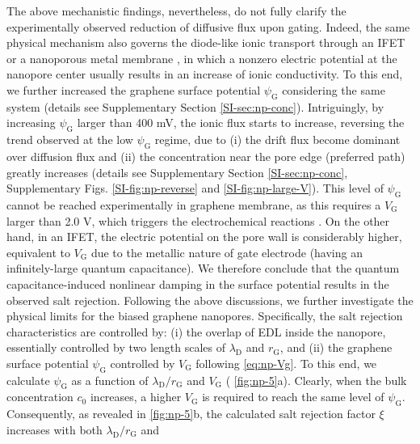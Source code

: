 The above mechanistic findings, nevertheless, do not fully clarify the
experimentally observed reduction of diffusive flux upon
gating. Indeed, the same physical mechanism also governs the {
  diode-like ionic transport through an IFET
  \cite{Nam_2009_IFET_sub10nm,Lee_2015_sub10nm,Feng_2016_porous_MoS2} or a nanoporous metal membrane
  \cite{Mccurry_2017_electrolyte_porus_gold}}, in which a nonzero electric
potential at the nanopore center usually results in an increase of
ionic conductivity. To this end, we further increased the graphene
surface potential $\psi_{\mathrm{G}}$ considering the same system
(details see Supplementary Section \autoref{SI-sec:np-conc}). Intriguingly,
by increasing $\psi_{\mathrm{G}}$ larger than 400 mV, the ionic flux
starts to increase, reversing the trend observed at the low
$\psi_{\mathrm{G}}$ regime, due to (i) the drift flux become dominant
over diffusion flux and (ii) the concentration near the pore edge
(preferred path) greatly increases (details see Supplementary Section
\autoref{SI-sec:np-conc}, Supplementary Figs. \autoref{SI-fig:np-reverse} and
\autoref{SI-fig:np-large-V}). This level of $\psi_{\mathrm{G}}$ cannot be
reached experimentally in graphene membrane, as this requires a
$V_{\mathrm{G}}$ larger than 2.0 V, which triggers the electrochemical
reactions \cite{Toh_2011_GO_electrochem}. On the other hand, in an IFET, the electric
potential on the pore wall is considerably higher, equivalent to
$V_{\mathrm{G}}$ due to the metallic nature of gate electrode (having
an infinitely-large quantum capacitance). We therefore conclude that
the quantum capacitance-induced nonlinear damping in the surface
potential results in the observed salt rejection.  Following the above
discussions, we further investigate the physical limits for the biased
graphene nanopores. Specifically, the salt rejection characteristics
are controlled by: (i) the overlap of EDL inside the nanopore,
essentially controlled by two length scales of $\lambda_{\mathrm{D}}$
and $r_{\mathrm{G}}$, and (ii) the graphene surface potential
$\psi_{\mathrm{G}}$ controlled by $V_{\mathrm{G}}$ following
 \autoref{eq:np-Vg}. To this end, we calculate $\psi_{\mathrm{G}}$ as a
function of $\lambda_{\mathrm{D}} / r_{\mathrm{G}}$ and
$V_{\mathrm{G}}$ ( \autoref{fig:np-5}a). Clearly, when the bulk
concentration $c_{0}$ increases, a higher $V_{\mathrm{G}}$ is required
to reach the same level of $\psi_{\mathrm{G}}$. Consequently, as
revealed in  \autoref{fig:np-5}b, the calculated salt rejection factor
$\xi$ increases with both $\lambda_{\mathrm{D}} / r_{\mathrm{G}}$ and
